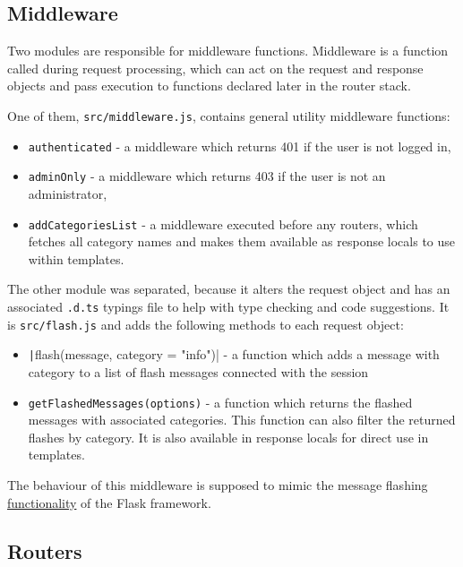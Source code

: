 \subsection{Middleware}

Two modules are responsible for middleware functions. Middleware is a function called during request processing, which can act on the request and response objects and pass execution to functions declared later in the router stack.

One of them, \texttt{src/middleware.js}, contains general utility middleware functions:

\begin{itemize}
    \item \texttt{authenticated} - a middleware which returns 401 if the user is not logged in,
    \item \texttt{adminOnly} - a middleware which returns 403 if the user is not an administrator,
    \item \texttt{addCategoriesList} - a middleware executed before any routers, which fetches all category names and makes them available as response locals to use within templates.
\end{itemize}

The other module was separated, because it alters the request object and has an associated \texttt{.d.ts} typings file to help with type checking and code suggestions. It is \texttt{src/flash.js} and adds the following methods to each request object:

\begin{itemize}
    \item \texttt|flash(message, category = "info")| - a function which adds a message with category to a list of flash messages connected with the session
    \item \texttt{getFlashedMessages(options)} - a function which returns the flashed messages with associated categories. This function can also filter the returned flashes by category. It is also available in response locals for direct use in templates.
\end{itemize}

The behaviour of this middleware is supposed to mimic the message flashing \href{https://flask.palletsprojects.com/en/2.2.x/quickstart/#message-flashing}{functionality} of the Flask framework.

\subsection{Routers}

